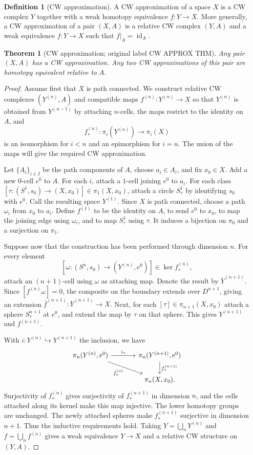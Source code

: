 \documentclass[UTF8,11pt]{ctexart}
\newtheorem*{theorem}{Theorem}
\theoremstyle{definition}
\newtheorem*{definition}{Definition}
\DeclareMathOperator{\id}{id}
\begin{document}
\begin{definition}[CW approximation]
A CW approximation of a space $X$ is a CW complex $Y$ together with a weak
homotopy equivalence $f:Y\to X$. More generally, a CW approximation of a pair
$(X,A)$ is a relative CW complex $(Y,A)$ and a weak equivalence $f:Y\to X$
such that $f|_A=\id_A$.
\end{definition}
\begin{theorem}[CW approximation; original label CW APPROX THM]
Any pair $(X,A)$ has a CW approximation. Any two CW approximations of this pair
are homotopy equivalent relative to $A$.
\end{theorem}
\begin{proof}
Assume first that $X$ is path connected. We construct relative CW complexes
$(Y^{(n)},A)$ and compatible maps $f^{(n)}:Y^{(n)}\to X$ so that
$Y^{(n)}$ is obtained from $Y^{(n-1)}$ by attaching $n$-cells, the maps restrict
to the identity on $A$, and
\[
 f^{(n)}_*:\pi_i(Y^{(n)})\longrightarrow\pi_i(X)
\]
is an isomorphism for $i<n$ and an epimorphism for $i=n$.
The union of the maps will give the required CW approximation.

Let $\{A_i\}_{i\in I}$ be the path components of $A$, choose $a_i\in A_i$,
and fix $x_0\in X$. Add a new $0$-cell $e^0$ to $A$. For each $i$, attach a
$1$-cell joining $e^0$ to $a_i$. For each class
$[\tau:(S^1,s_0)\to(X,x_0)]\in\pi_1(X,x_0)$, attach a circle $S^1_\tau$
by identifying $s_0$ with $e^0$. Call the resulting space $Y^{(1)}$.
Since $X$ is path connected, choose a path $\omega_i$ from $x_0$ to $a_i$.
Define $f^{(1)}$ to be the identity on $A$, to send $e^0$ to $x_0$, to map
the joining edge using $\omega_i$, and to map $S^1_\tau$ using $\tau$.
It induces a bijection on $\pi_0$ and a surjection on $\pi_1$.

Suppose now that the construction has been performed through dimension $n$.
For every element
\[
 [\omega:(S^n,s_0)\to(Y^{(n)},e^0)]\in\ker f^{(n)}_*,
\]
attach an $(n+1)$-cell using $\omega$ as attaching map. Denote the result by
$\overline Y^{(n+1)}$. Since $[f^{(n)}\omega]=0$, the composite on the
boundary extends over $D^{n+1}$, giving an extension
$\overline f^{(n+1)}:\overline Y^{(n+1)}\to X$.
Next, for each $[\tau]\in\pi_{n+1}(X,x_0)$ attach a sphere
$S^{n+1}_\tau$ at $e^0$, and extend the map by $\tau$ on that sphere.
This gives $Y^{(n+1)}$ and $f^{(n+1)}$.

With $i:Y^{(n)}\hookrightarrow Y^{(n+1)}$ the inclusion, we have
\[
\begin{tikzcd}[column sep=large]
\pi_n(Y^{(n)},e^0) \arrow[r,"i_*"] \arrow[dr,"f^{(n)}_*"'] &
\pi_n(Y^{(n+1)},e^0) \arrow[d,"f^{(n+1)}_*"]\\
&\pi_n(X,x_0).
\end{tikzcd}
\]
Surjectivity of $f^{(n)}_*$ gives surjectivity of $f^{(n+1)}_*$ in dimension
$n$, and the cells attached along its kernel make this map injective.
The lower homotopy groups are unchanged. The newly attached spheres make
$f^{(n+1)}_*$ surjective in dimension $n+1$. Thus the inductive requirements
hold. Taking $Y=\bigcup_nY^{(n)}$ and $f=\bigcup_nf^{(n)}$ gives a weak
equivalence $Y\to X$ and a relative CW structure on $(Y,A)$.


\end{proof}
\end{document}
